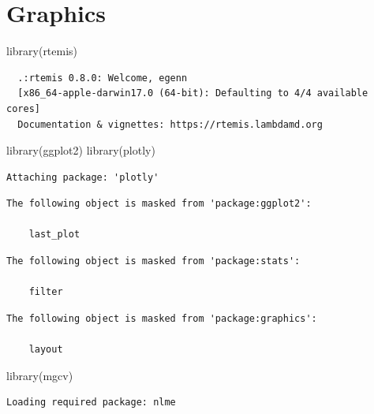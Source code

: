 \documentclass[
]{book}
\newenvironment{Shaded}{\begin{snugshade}}{\end{snugshade}}
\newcommand{\FunctionTok}[1]{\textcolor[rgb]{0.00,0.00,0.00}{#1}}
\newcommand{\NormalTok}[1]{#1}
\begin{document}
\hypertarget{graphics}{%
\chapter{Graphics}\label{graphics}}

\begin{Shaded}
\begin{Highlighting}[]
\FunctionTok{library}\NormalTok{(rtemis)}
\end{Highlighting}
\end{Shaded}

\begin{verbatim}
  .:rtemis 0.8.0: Welcome, egenn
  [x86_64-apple-darwin17.0 (64-bit): Defaulting to 4/4 available cores]
  Documentation & vignettes: https://rtemis.lambdamd.org
\end{verbatim}

\begin{Shaded}
\begin{Highlighting}[]
\FunctionTok{library}\NormalTok{(ggplot2)}
\FunctionTok{library}\NormalTok{(plotly)}
\end{Highlighting}
\end{Shaded}

\begin{verbatim}
Attaching package: 'plotly'
\end{verbatim}

\begin{verbatim}
The following object is masked from 'package:ggplot2':

    last_plot
\end{verbatim}

\begin{verbatim}
The following object is masked from 'package:stats':

    filter
\end{verbatim}

\begin{verbatim}
The following object is masked from 'package:graphics':

    layout
\end{verbatim}

\begin{Shaded}
\begin{Highlighting}[]
\FunctionTok{library}\NormalTok{(mgcv)}
\end{Highlighting}
\end{Shaded}

\begin{verbatim}
Loading required package: nlme
\end{verbatim}
\end{document}
